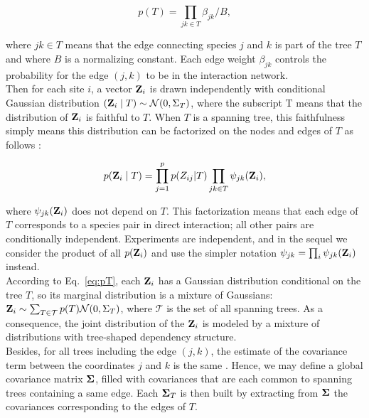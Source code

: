 \begin{equation} \label{eq:pT}
    p(T) = \prod_{jk \in T} \beta_{jk} / B,
\end{equation}
 
where $jk \in T$ means that the edge connecting species $j$ and $k$ is part of the tree $T$ and where $B$ is a normalizing constant. Each edge weight $\beta_{jk}$ controls the probability for the edge $(j, k)$ to be in the interaction network. \\
Then for each site $i$, a vector ${\bf Z}_i$ is drawn independently with conditional Gaussian distribution $({\bf Z}_i \mid T) \sim \mathcal{N}(0, \Sigma_T)$, where the subscript T means that the distribution of ${\bf Z}_i$ is {faithful} to $T$. When $T$ is a spanning tree, this faithfulness simply means this distribution can be factorized on the nodes and edges of $T$ as follows \citep[see][]{kirshner}:
 
\begin{equation} \label{eq:pZfact}
p({\bf Z}_i \mid T) = \prod_{j=1}^p p(Z_{ij}|T) \prod_{jk \in T} \psi_{jk}({\bf Z}_i),
\end{equation}
 
where $\psi_{jk}({\bf Z}_i)$ does not depend on $T$. This factorization means that each edge of $T$ corresponds to a species pair in direct interaction;  all other pairs are conditionally independent. Experiments are independent, and in the sequel we consider the product of all $p({\bf Z}_i)$ and use the simpler notation $\psi_{jk} = \prod_i \psi_{jk}({\bf Z}_i)$ instead.\\

According to Eq.~\eqref{eq:pT}, each ${\bf Z}_i$ has a Gaussian distribution conditional on the tree $T$, so its marginal distribution is a mixture of Gaussians: ${\bf Z}_i \sim \sum_{T \in\mathcal{T}} p(T) \mathcal{N}(0, \Sigma_T)$, where $\mathcal{T}$ is the set of all spanning trees. As a consequence, the joint distribution of the ${\bf Z}_i$ is modeled by a mixture of distributions with tree-shaped dependency structure. \\
Besides, for all trees including the edge $(j, k)$, the estimate of the covariance term between the coordinates $j$ and $k$ is the same \citep[see][]{Lau96,SRS19}. Hence, we may define a global covariance matrix ${\boldsymbol{\Sigma}}$, filled with covariances that are each common to spanning trees containing a same edge. Each ${\boldsymbol{\Sigma}}_T$ is then built by extracting from ${\boldsymbol{\Sigma}}$ the covariances corresponding to the edges of $T$.

